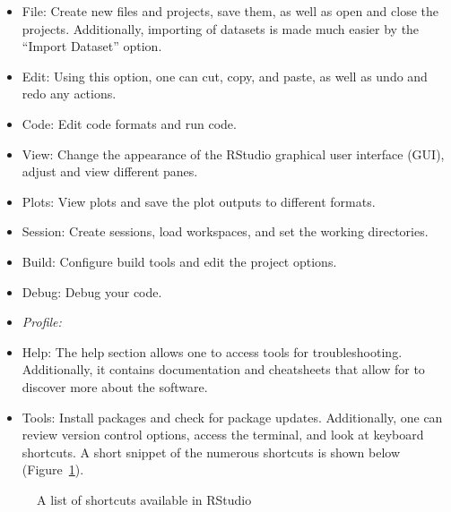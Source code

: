 \documentclass[
  letterpaper,
  DIV=11,
  numbers=noendperiod]{scrreprt}
\begin{document}
\begin{itemize}
\item
  File: Create new files and projects, save them, as well as open and
  close the projects. Additionally, importing of datasets is made much
  easier by the ``Import Dataset'' option.
\item
  Edit: Using this option, one can cut, copy, and paste, as well as undo
  and redo any actions.
\item
  Code: Edit code formats and run code.
\item
  View: Change the appearance of the RStudio graphical user interface
  (GUI), adjust and view different panes.
\item
  Plots: View plots and save the plot outputs to different formats.
\item
  Session: Create sessions, load workspaces, and set the working
  directories.
\item
  Build: Configure build tools and edit the project options.
\item
  Debug: Debug your code.
\item
  \emph{Profile:}
\item
  Help: The help section allows one to access tools for troubleshooting.
  Additionally, it contains documentation and cheatsheets that allow for
  to discover more about the software.
\item
  Tools: Install packages and check for package updates. Additionally,
  one can review version control options, access the terminal, and look
  at keyboard shortcuts. A short snippet of the numerous shortcuts is
  shown below (Figure~\ref{fig-rstudio-ks-1}).
\end{itemize}

\begin{figure}


\caption{\label{fig-rstudio-ks-1}A list of shortcuts available in
RStudio}

\end{figure}%
\end{document}
